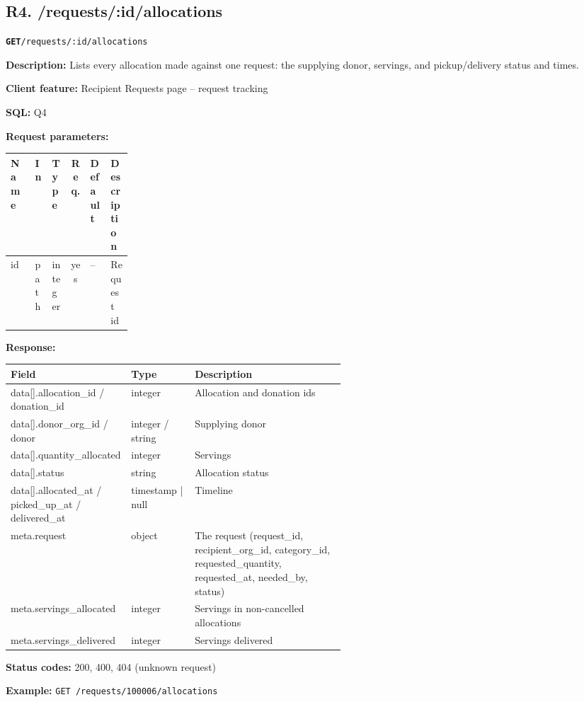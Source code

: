 \documentclass[11pt,letterpaper]{article}
\newcommand{\brk}{\penalty0\relax}
\newcommand{\routebar}[2]{%
  \par\noindent\colorbox{boxGray}{\parbox{\dimexpr\linewidth-2\fboxsep}{%
  \strut\textbf{\texttt{#1}}\quad\texttt{#2}\strut}}\par\smallskip}
\newcommand{\kv}[2]{\textbf{#1:} #2\par}
\begin{document}
\subsection*{R4. /requests/:id/allocations}
\routebar{GET}{/requests/:id/allocations}
\kv{Description}{Lists every allocation made against one request: the supplying donor, servings, and pickup/delivery status and times.}
\kv{Client feature}{Recipient Requests page -- request tracking}
\kv{SQL}{Q4}
\kv{Request parameters}{}
\begin{xltabular}{\linewidth}{>{\ttfamily\raggedright\arraybackslash}p{0.2\linewidth} l l c l >{\raggedright\arraybackslash}X}
\toprule
\textrm{\textbf{Name}} & \textbf{In} & \textbf{Type} & \textbf{Req.} & \textbf{Default} & \textbf{Description} \\
\midrule
id & path & integer & yes & -- & Request id \\
\bottomrule
\end{xltabular}
\kv{Response}{}
\begin{xltabular}{\linewidth}{>{\ttfamily\raggedright\arraybackslash}p{0.36\linewidth} >{\raggedright\arraybackslash}p{0.19\linewidth} >{\raggedright\arraybackslash}X}
\toprule
\textrm{\textbf{Field}} & \textbf{Type} & \textbf{Description} \\
\midrule
data[].\brk{}allocation\_id /\brk{} donation\_id & integer & Allocation and donation ids \\
data[].\brk{}donor\_org\_id /\brk{} donor & integer / string & Supplying donor \\
data[].\brk{}quantity\_allocated & integer & Servings \\
data[].\brk{}status & string & Allocation status \\
data[].\brk{}allocated\_at /\brk{} picked\_up\_at /\brk{} delivered\_at & timestamp | null & Timeline \\
meta.\brk{}request & object & The request (request\_id, recipient\_org\_id, category\_id, requested\_quantity, requested\_at, needed\_by, status) \\
meta.\brk{}servings\_allocated & integer & Servings in non-cancelled allocations \\
meta.\brk{}servings\_delivered & integer & Servings delivered \\
\bottomrule
\end{xltabular}
\kv{Status codes}{200, 400, 404 (unknown request)}
{\raggedright\textbf{Example:} {\small \texttt{GET /\brk{}requests/\brk{}100006/\brk{}allocations}}\par}
\end{document}
